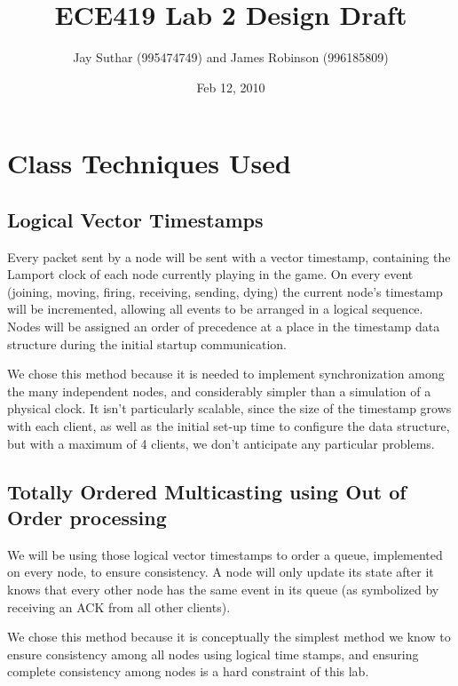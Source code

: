 \documentclass[12pt]{article}
\begin{document}
\title{ECE419 Lab 2 Design Draft}

\author{Jay Suthar (995474749) and James Robinson (996185809)}

\date{Feb 12, 2010}

\maketitle

\section{Class Techniques Used}

\subsection{Logical Vector Timestamps}

Every packet sent by a node will be sent with a vector timestamp, containing the Lamport clock of each node currently playing in the game.  On every event (joining, moving, firing, receiving, sending, dying) the current node's timestamp will be incremented, allowing all events to be arranged in a logical sequence.  Nodes will be assigned an order of precedence at a place in the timestamp data structure during the initial startup communication.

We chose this method because it is needed to implement synchronization among the many independent nodes, and considerably simpler than a simulation of a physical clock.  It isn't particularly scalable, since the size of the timestamp grows with each client, as well as the initial set-up time to configure the data structure, but with a maximum of 4 clients, we don't anticipate any particular problems.

\subsection{Totally Ordered Multicasting using Out of Order processing}

We will be using those logical vector timestamps to order a queue, implemented on every node, to ensure consistency.  A node will only update its state after it knows that every other node has the same event in its queue (as symbolized by receiving an ACK from all other clients).

We chose this method because it is conceptually the simplest method we know to ensure consistency among all nodes using logical time stamps, and ensuring complete consistency among nodes is a hard constraint of this lab.
\end{document}
